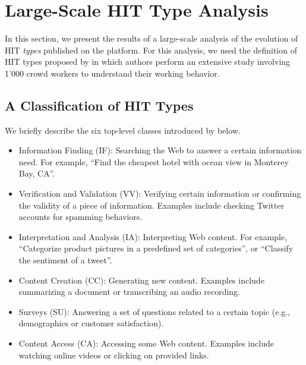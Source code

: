 \section{Large-Scale HIT Type Analysis}\label{sec:type}
In this section, we present the results of a large-scale analysis of the evolution of HIT \emph{types} published on the \amt{} platform.
For this analysis, we used the definition of HIT types proposed by \cite{Gadiraju:2014:TMW:2631775.2631819} in which authors perform an extensive study involving 1'000 crowd workers to understand their working behavior. 

\subsection{A Classification of HIT Types}
We briefly describe the six top-level classes introduced by \cite{Gadiraju:2014:TMW:2631775.2631819} below.

\begin{itemize}[noitemsep,topsep=0pt,parsep=0pt,partopsep=0pt]

	\item Information Finding (IF): Searching the Web to answer a certain information need. For example, ``Find the cheapest hotel with ocean view in Monterey Bay, CA''.
	
	\item Verification and Validation (VV): Verifying certain information or confirming the validity of a piece of information. Examples include checking Twitter accounts for spamming behaviors.

	\item Interpretation and Analysis (IA): Interpreting Web content. For example, ``Categorize product pictures in a predefined set of categories'', or ``Classify the sentiment of a tweet''.
	
	\item Content Creation (CC): Generating new content. Examples include summarizing a document  or transcribing an audio recording.

	\item Surveys (SU): Answering a set of questions related to a certain topic (e.g., demographics or customer satisfaction). 
	
	\item Content Access (CA): Accessing some Web content. Examples include watching online videos or clicking on provided links.

\end{itemize}

